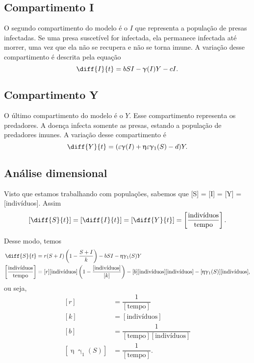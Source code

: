 \documentclass{article}
\begin{document}
\subsection{Compartimento I}
O segundo compartimento do modelo é o $I$ que representa a população de presas infectadas. Se uma presa suscetível for infectada, ela permanece infectada até morrer, uma vez que ela não se recupera e não se torna imune. A variação desse compartimento é descrita pela equação
\begin{equation*}
    \diff{I}{t} = bSI - \upgamma(I)Y - cI.
\end{equation*}

\subsection{Compartimento Y}
O último compartimento do modelo é o $Y$. Esse compartimento representa  os predadores. A doença infecta somente as presas, estando a população de predadores imunes. A variação desse compartimento é
\begin{equation*}
    \diff{Y}{t} = (\varepsilon \upgamma(I) + \upeta \varepsilon \upgamma_1(S) - d)Y.
\end{equation*}

\subsection{Análise dimensional}
Visto que estamos trabalhando com populações, sabemos que [S] = [I] = [Y] = [indivíduos]. Assim
\begin{equation*}
    \left[ \diff{S}{t} \right] = \left[ \diff{I}{t} \right] = \left[ \diff{Y}{t} \right] = \left[ \dfrac{\text{indivíduos}}{\text{tempo}}\right].
\end{equation*}

Desse modo, temos
\begin{equation*}
\begin{split}
    \diff{S}{t} & = r(S+I) \left( 1 - \dfrac{S+I}{k} \right) - bSI - \upeta \upgamma_1(S)Y \\
    \left[ \dfrac{\text{indivíduos}}{\text{tempo}} \right] & = [r] \text{[indivíduos]} \left( 1 - \dfrac{\text{[indivíduos]}}{[k]} \right) - [b] \text{[indivíduos]} \text{[indivíduos]} - [\upeta \upgamma_1(S)] \text{[indivíduos]},
\end{split}
\end{equation*}
ou seja,
\begin{equation*}
\begin{split}
    [r] & =  \dfrac{1}{[\text{tempo}]}  \\
    [k] & = [\text{indivíduos}] \\
    [b] & = \dfrac{1}{[\text{tempo}] [\text{indivíduos}]} \\
    [\upeta \upgamma_1(S)] & = \dfrac{1}{[\text{tempo}]}.
\end{split}
\end{equation*}
\end{document}
